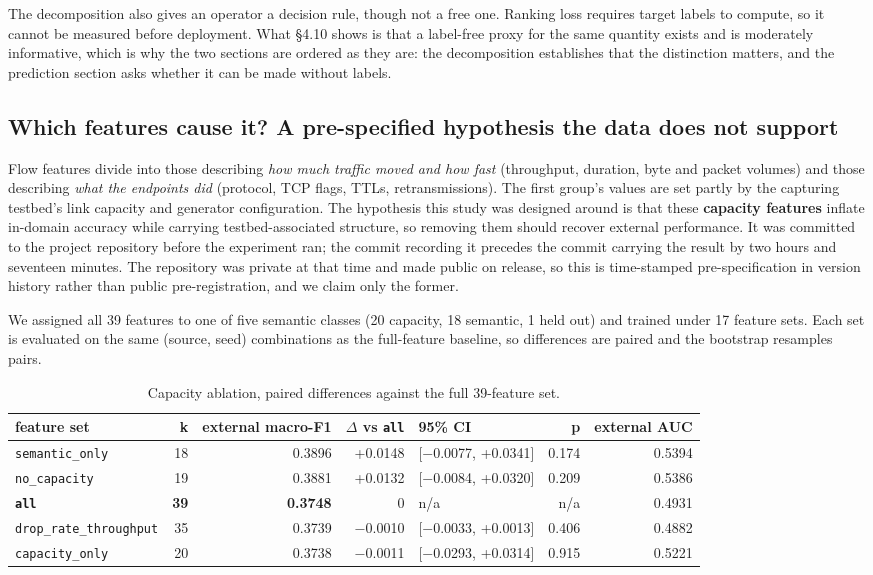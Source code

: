 \documentclass[11pt,a4paper]{article}
\begin{document}
The decomposition also gives an operator a decision rule, though not a free one. Ranking loss requires target labels to compute, so it cannot be measured before deployment. What §4.10 shows is that a label-free proxy for the same quantity exists and is moderately informative, which is why the two sections are ordered as they are: the decomposition establishes that the distinction matters, and the prediction section asks whether it can be made without labels.

\subsection{Which features cause it? A pre-specified hypothesis the data does not support}

Flow features divide into those describing \emph{how much traffic moved and how fast} (throughput, duration, byte and packet volumes) and those describing \emph{what the endpoints did} (protocol, TCP flags, TTLs, retransmissions). The first group's values are set partly by the capturing testbed's link capacity and generator configuration. The hypothesis this study was designed around is that these \textbf{capacity features} inflate in-domain accuracy while carrying testbed-associated structure, so removing them should recover external performance. It was committed to the project repository before the experiment ran; the commit recording it precedes the commit carrying the result by two hours and seventeen minutes. The repository was private at that time and made public on release, so this is time-stamped pre-specification in version history rather than public pre-registration, and we claim only the former.

We assigned all 39 features to one of five semantic classes (20 capacity, 18 semantic, 1 held out) and trained under 17 feature sets. Each set is evaluated on the same (source, seed) combinations as the full-feature baseline, so differences are paired and the bootstrap resamples pairs.

\begin{table}[htbp]\centering\small
\caption{Capacity ablation, paired differences against the full 39-feature set.}
\begin{tabular}{lrrrlrr}
\toprule
feature set & k & external macro-F1 & $\Delta$ vs \texttt{all} & 95\% CI & p & external AUC \\
\midrule
\texttt{semantic\_only} & 18 & 0.3896 & +0.0148 & [$-$0.0077, +0.0341] & 0.174 & 0.5394 \\
\texttt{no\_capacity} & 19 & 0.3881 & +0.0132 & [$-$0.0084, +0.0320] & 0.209 & 0.5386 \\
\textbf{\texttt{all}} & \textbf{39} & \textbf{0.3748} & 0 & n/a & n/a & 0.4931 \\
\texttt{drop\_rate\_throughput} & 35 & 0.3739 & $-$0.0010 & [$-$0.0033, +0.0013] & 0.406 & 0.4882 \\
\texttt{capacity\_only} & 20 & 0.3738 & $-$0.0011 & [$-$0.0293, +0.0314] & 0.915 & 0.5221 \\
\bottomrule
\end{tabular}
\end{table}
\end{document}
